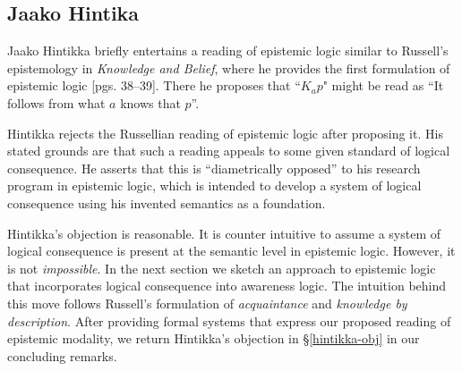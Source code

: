 \subsection{Jaako Hintika}\label{Russell}

Jaako Hintikka briefly entertains a reading of
epistemic logic similar to Russell's epistemology 
in \emph{Knowledge and Belief}, where he provides the
first formulation of epistemic logic
\cite{hintikka_knowledge_1969}[pgs. 38--39].  
There he proposes that ``$K_a
p$" might be read as ``It follows from what $a$ knows that $p$''.

Hintikka rejects the Russellian reading of epistemic logic after
proposing it. His stated grounds are that
such a reading appeals to some given standard of logical consequence.  
He asserts that this is ``diametrically opposed'' to his research program in epistemic logic,
which is intended to develop a system of logical consequence using his
invented semantics as a foundation.

Hintikka's objection is reasonable.  It is counter intuitive to assume
a system of logical consequence is present at the semantic level in
epistemic logic.
However, it is not \emph{impossible}.  In the next section we sketch
an approach to epistemic logic that incorporates logical consequence
into awareness logic.  The intuition behind this move follows
Russell's formulation of \emph{acquaintance} and \emph{knowledge by
  description}.  After providing formal systems that express our
proposed reading of epistemic modality, we return Hintikka's objection
in \S\ref{hintikka-obj} in our concluding remarks.


